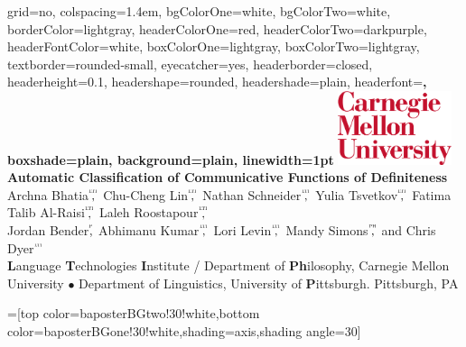\documentclass[landscape,final]{baposter}
\begin{document}
\begin{poster}{
  grid=no,
  colspacing=1.4em,
  bgColorOne=white, %
  bgColorTwo=white, %
  borderColor=lightgray, %
  headerColorOne=red, %
  headerColorTwo=darkpurple, %
  headerFontColor=white,
  boxColorOne=lightgray, %
  boxColorTwo=lightgray, %
  textborder=rounded-small, %
  eyecatcher=yes,
  headerborder=closed,
  headerheight=0.1\textheight,
  headershape=rounded, %
  headershade=plain,
  headerfont=\large\bf\sc\textsf, %
  boxshade=plain,
  background=plain,
  linewidth=1pt
}
  {%
\includegraphics[width=9em]{img/cmu_logo}\\
} %
  {\bf %
  \textsf{Automatic Classification of Communicative Functions of Definiteness}
  }
  {\large %
  Archna Bhatia$\overset{^\textsc{lti}}{\textrm{,}}$ Chu-Cheng Lin$\overset{^\textsc{lti}}{\textrm{,}}$ Nathan Schneider$\overset{^\textsc{lti}}{\textrm{,}}$ Yulia Tsvetkov$\overset{^\textsc{lti}}{\textrm{,}}$ Fatima Talib Al-Raisi$\overset{^\textsc{lti}}{\textrm{,}}$ Laleh Roostapour$\overset{^\textsc{lti}}{\textrm{,}}$ \\ Jordan Bender$\overset{^\textsc{p}}{\textrm{,}}$ Abhimanu Kumar$\overset{^\textsc{lti}}{\textrm{,}}$ Lori Levin$\overset{^\textsc{lti}}{\textrm{,}}$ Mandy Simons$\overset{^\textsc{ph}}{\textrm{,}}$ and Chris Dyer$\overset{^\textsc{lti}}{\textrm{}}$
  \\
  \textbf{L}anguage \textbf{T}echnologies \textbf{I}nstitute / Department of \textbf{Ph}ilosophy, Carnegie Mellon University $\bullet$ Department of Linguistics, University of \textbf{P}ittsburgh. Pittsburgh, PA
  }

  =[top color=baposterBGtwo!30!white,bottom color=baposterBGone!30!white,shading=axis,shading angle=30]


\end{poster}
\end{document}
